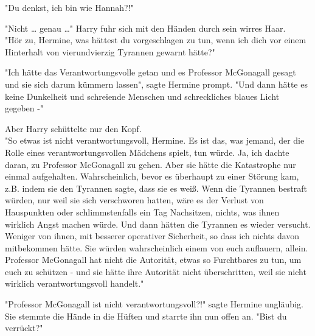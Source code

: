 {"Du denkst, ich bin wie Hannah?!"

"Nicht … genau …" Harry fuhr sich mit den Händen durch sein wirres Haar.\\ "Hör zu, Hermine, was hättest du vorgeschlagen zu tun, wenn ich dich vor einem Hinterhalt von vierundvierzig Tyrannen gewarnt hätte?"

"Ich hätte das Verantwortungsvolle getan und es Professor McGonagall gesagt und sie sich darum kümmern lassen", sagte Hermine prompt. "Und dann hätte es keine Dunkelheit und schreiende Menschen und schreckliches blaues Licht gegeben -"

Aber Harry schüttelte nur den Kopf.\\ "So etwas ist nicht verantwortungsvoll, Hermine. Es ist das, was jemand, der die Rolle eines verantwortungsvollen Mädchens spielt, tun würde. Ja, ich dachte daran, zu Professor McGonagall zu gehen. Aber sie hätte die Katastrophe nur einmal aufgehalten. Wahrscheinlich, bevor es überhaupt zu einer Störung kam, z.B. indem sie den Tyrannen sagte, dass sie es weiß. Wenn die Tyrannen bestraft würden, nur weil sie sich verschworen hatten, wäre es der Verlust von Hauspunkten oder schlimmstenfalls ein Tag Nachsitzen, nichts, was ihnen wirklich Angst machen würde. Und dann hätten die Tyrannen es wieder versucht. Weniger von ihnen, mit besserer operativer Sicherheit, so dass ich nichts davon mitbekommen hätte. Sie würden wahrscheinlich einem von euch auflauern, allein. Professor McGonagall hat nicht die Autorität, etwas so Furchtbares zu tun, um euch zu schützen - und sie hätte ihre Autorität nicht überschritten, weil sie nicht wirklich verantwortungsvoll handelt."

"Professor McGonagall ist nicht verantwortungsvoll?!" sagte Hermine ungläubig.\\ Sie stemmte die Hände in die Hüften und starrte ihn nun offen an. "Bist du verrückt?"

}
